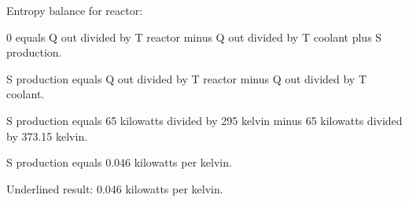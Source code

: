 Entropy balance for reactor:  

0 equals Q out divided by T reactor minus Q out divided by T coolant plus S production.  

S production equals Q out divided by T reactor minus Q out divided by T coolant.  

S production equals 65 kilowatts divided by 295 kelvin minus 65 kilowatts divided by 373.15 kelvin.  

S production equals 0.046 kilowatts per kelvin.  

Underlined result: 0.046 kilowatts per kelvin.
